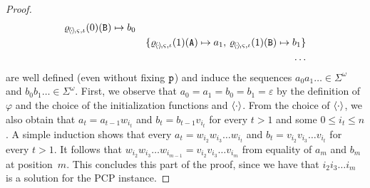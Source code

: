 \begin{proof}
\begin{eqnarray*}
{                                                             \varrho_{\hspace{-1pt}\langle \hspace{-1pt}\cdot
    \hspace{-1pt}\rangle \hspace{-1pt}, \ensuremath{\varsigma}, \iota}(0)({\text{\texttt{B}}}) \mapsto b_{0} } \\
    & & \{  \varrho_{\hspace{-1pt}\langle \hspace{-1pt}\cdot
    \hspace{-1pt}\rangle \hspace{-1pt}, \varsigma, \iota}(1)({\text{\texttt{A}}})
    \mapsto a_{1}, \, \varrho_{\hspace{-1pt}\langle \hspace{-1pt}\cdot
    \hspace{-1pt}\rangle \hspace{-1pt}, \varsigma, \iota}(1)({\text{\texttt{B}}}) \mapsto b_{1}  \} \\
    & & \ldots
  \end{eqnarray*}
  are well defined (even without fixing $ {\text{\texttt{p}}} $) and induce the
  sequences $ a_{0}a_{1}\ldots \in \Sigma^{\omega} $ and
  $ b_{0}b_{1}\ldots \in \Sigma^{\omega} $. First, we observe that
  $ a_{0} = a_{1} = b_{0} = b_{1} = \varepsilon $ by the definition of
  $ \varphi $ and the choice of the initialization functions and
  $ \langle \cdot \rangle $. From the choice of $ \langle \cdot \rangle $, we also
  obtain that $ a_{t} = a_{t-1}w_{i_{t}} $ and
  $ b_{t} = b_{t-1}v_{i_{t}} $ for every $ t > 1 $ and some
  $ 0 \leq i_{t} \leq n $. A simple induction shows that every
  $ a_{t} = w_{i_{2}}w_{i_{3}}\ldots w_{i_{t}} $ and
  $ b_{t} = v_{i_{2}}v_{i_{3}} \ldots v_{i_{t}} $ for every $ t > 1
  $. It follows that
  $ w_{i_{2}}w_{i_{3}}\ldots w_{i_{m-1}} = v_{i_{2}}v_{i_{3}} \ldots
  v_{i_{m}} $ from equality of $ a_{m} $ and $ b_{m} $ at
  position~$ m $. This concludes this part of the proof, since we have
  that $ i_{2}i_{3}\ldots i_{m} $ is a solution for the PCP instance.

  \smallskip


\end{proof}
